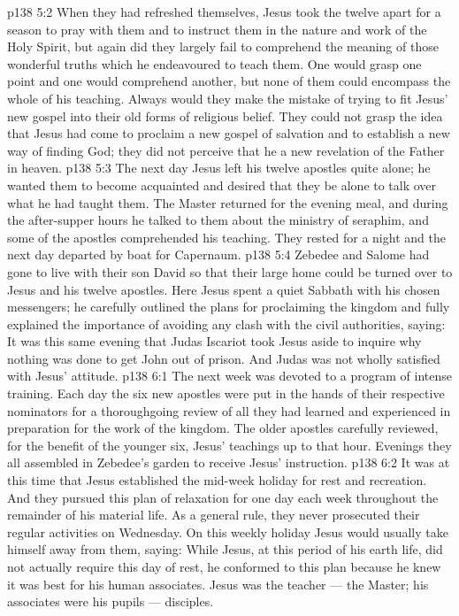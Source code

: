 \vs p138 5:2 \pc When they had refreshed themselves, Jesus took the twelve apart for a season to pray with them and to instruct them in the nature and work of the Holy Spirit, but again did they largely fail to comprehend the meaning of those wonderful truths which he endeavoured to teach them. One would grasp one point and one would comprehend another, but none of them could encompass the whole of his teaching. Always would they make the mistake of trying to fit Jesus’ new gospel into their old forms of religious belief. They could not grasp the idea that Jesus had come to proclaim a new gospel of salvation and to establish a new way of finding God; they did not perceive that he  a new revelation of the Father in heaven.
\vs p138 5:3 The next day Jesus left his twelve apostles quite alone; he wanted them to become acquainted and desired that they be alone to talk over what he had taught them. The Master returned for the evening meal, and during the after\hyp{}supper hours he talked to them about the ministry of seraphim, and some of the apostles comprehended his teaching. They rested for a night and the next day departed by boat for Capernaum.
\vs p138 5:4 Zebedee and Salome had gone to live with their son David so that their large home could be turned over to Jesus and his twelve apostles. Here Jesus spent a quiet Sabbath with his chosen messengers; he carefully outlined the plans for proclaiming the kingdom and fully explained the importance of avoiding any clash with the civil authorities, saying:  It was this same evening that Judas Iscariot took Jesus aside to inquire why nothing was done to get John out of prison. And Judas was not wholly satisfied with Jesus’ attitude.
\vs p138 6:1 The next week was devoted to a program of intense training. Each day the six new apostles were put in the hands of their respective nominators for a thoroughgoing review of all they had learned and experienced in preparation for the work of the kingdom. The older apostles carefully reviewed, for the benefit of the younger six, Jesus’ teachings up to that hour. Evenings they all assembled in Zebedee’s garden to receive Jesus’ instruction.
\vs p138 6:2 It was at this time that Jesus established the mid\hyp{}week holiday for rest and recreation. And they pursued this plan of relaxation for one day each week throughout the remainder of his material life. As a general rule, they never prosecuted their regular activities on Wednesday. On this weekly holiday Jesus would usually take himself away from them, saying:  While Jesus, at this period of his earth life, did not actually require this day of rest, he conformed to this plan because he knew it was best for his human associates. Jesus was the teacher --- the Master; his associates were his pupils --- disciples.
